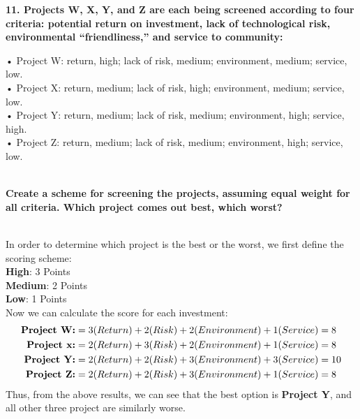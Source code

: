 \documentclass{article}
\begin{document}
    \begin{minipage}{\textwidth}
        \textbf{11. Projects W, X, Y, and Z are each being screened according to four criteria: potential return on investment, lack of technological risk, environmental “friendliness,” and service to community:}\\[0.5em]
        \hspace*{1cm}\begin{minipage}{0.8\textwidth}
            • Project W: return, high; lack of risk, medium; environment, medium; service, low.\\
            • Project X: return, medium; lack of risk, high; environment, medium; service, low.\\
            • Project Y: return, medium; lack of risk, medium; environment, high; service, high.\\
            • Project Z: return, medium; lack of risk, medium; environment, high; service, low.
        \end{minipage}\\[0.5em]
        \textbf{Create a scheme for screening the projects, assuming equal weight for all criteria. Which project comes out best, which worst?}
    \end{minipage}\\[1em]
    In order to determine which project is the best or the worst, we first define the scoring scheme:\\[0.5em]
    \hspace*{1cm} \textbf{High}: 3 Points\\
    \hspace*{1cm} \textbf{Medium}: 2 Points\\
    \hspace*{1cm} \textbf{Low}: 1 Points\\[0.5em]
    Now we can calculate the score for each investment:
    \begin{align*}
        \text{\textbf{Project W:}} &= 3 (Return) + 2 (Risk) + 2 (Environment) + 1 (Service) = 8\\
        \text{\textbf{Project x:}} &= 2 (Return) + 3 (Risk) + 2 (Environment) + 1 (Service) = 8\\
        \text{\textbf{Project Y:}} &= 2 (Return) + 2 (Risk) + 3 (Environment) + 3 (Service) = 10\\
        \text{\textbf{Project Z:}} &= 2 (Return) + 2 (Risk) + 3 (Environment) + 1 (Service) = 8
    \end{align*}
    Thus, from the above results, we can see that the best option is \textbf{Project Y}, and all other three project are similarly worse. \\[1em]
\end{document}
